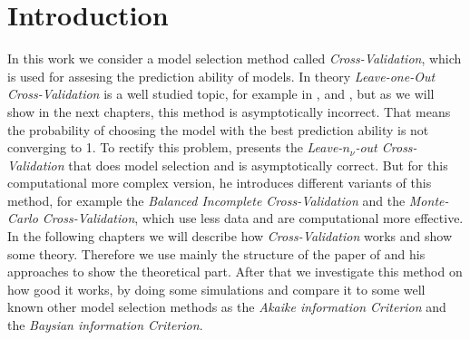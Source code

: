 \documentclass[Research_Module_ES.tex]{subfiles}
\begin{document}
\section{Introduction}	
In this work we consider a model selection method  called \textit{Cross-Validation}, which is used for assesing the prediction ability of models.
In theory \textit{Leave-one-Out Cross-Validation} is a well studied topic, for example in \cite{geisser1975predictive}, \cite{stone1974cross} and \cite{stone1977asymptotic}, but as we will show in the next chapters, this method is asymptotically incorrect. That means the probability of choosing the model with the best prediction ability is not converging to 1.
To rectify this problem, \cite{shao} presents the \textit{Leave-$n_\nu$-out Cross-Validation} that does model selection and is asymptotically correct. But for this computational more complex version, he introduces different variants of this method, for example the \textit{Balanced Incomplete Cross-Validation} and the \textit{Monte-Carlo Cross-Validation}, which use less data and are computational more effective. In the following chapters we will describe how \textit{Cross-Validation} works and show some theory. Therefore we use mainly the structure of the paper of \cite{shao} and his approaches to show the theoretical part. After that we investigate this method on how good it works, by doing some simulations and compare it to some well known other model selection methods as the \textit{Akaike information Criterion} and the \textit{Baysian information Criterion}.
\end{document}
